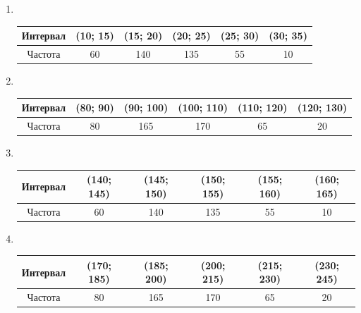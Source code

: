\documentclass[12pt,a4paper]{article}
\begin{document}
\begin{enumerate}
		\vspace{4em}

		\item \

		\begin{table}[htbp!]
			\centering
			\begin{tabular}{ |c|c|c|c|c|c| }
				\hline
				Интервал & (10; 15) & (15; 20) & (20; 25) & (25; 30) & (30; 35) \\
				\hline
				Частота & 60 & 140 & 135 & 55 & 10 \\
				\hline
			\end{tabular}
		\end{table}

		\vspace{4em}

		\item \

		\begin{table}[htbp!]
			\centering
			\begin{tabular}{ |c|c|c|c|c|c| }
				\hline
				Интервал & (80; 90) & (90; 100) & (100; 110) & (110; 120) & (120; 130) \\
				\hline
				Частота & 80 & 165 & 170 & 65 & 20 \\
				\hline
			\end{tabular}
		\end{table}

		\vspace{4em}

		\item \

		\begin{table}[htbp!]
			\centering
			\begin{tabular}{ |c|c|c|c|c|c| }
				\hline
				Интервал & (140; 145) & (145; 150) & (150; 155) & (155; 160) & (160; 165) \\
				\hline
				Частота & 60 & 140 & 135 & 55 & 10 \\
				\hline
			\end{tabular}
		\end{table}

		\vspace{4em}

		\item \

		\begin{table}[htbp!]
			\centering
			\begin{tabular}{ |c|c|c|c|c|c| }
				\hline
				Интервал & (170; 185) & (185; 200) & (200; 215) & (215; 230) & (230; 245) \\
				\hline
				Частота & 80 & 165 & 170 & 65 & 20 \\
				\hline
			\end{tabular}
		\end{table}


\end{enumerate}
\end{document}
